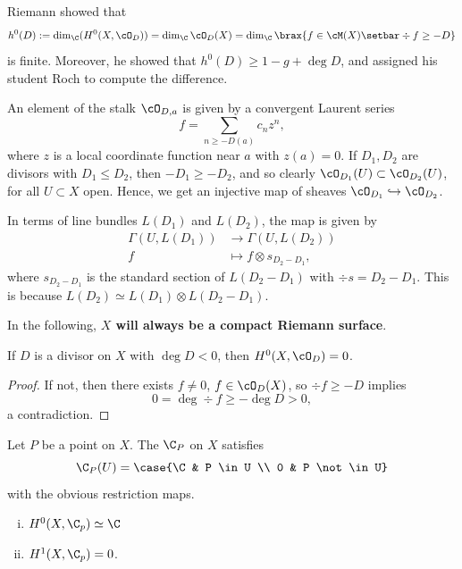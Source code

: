 \documentclass[11pt]{report}
\begin{document}
\begin{notebox}
    Riemann showed that
    \[
    h^0(D):= \dim_\C(H^0(X,\cO_D))=\dim_\C \cO_D(X)=\dim_\C \brax{f \in \cM(X) \setbar \div f \geq -D}
    \]
    is finite. Moreover, he showed that $h^0(D) \geq 1 -g + \deg D$, and assigned his student Roch to compute the difference.
\end{notebox}

An element of the stalk $\cO_{D,a}$ is given by a convergent Laurent series
\[
f = \sum_{n \geq -D(a)}c_nz^n,
\]
where $z$ is a local coordinate function near $a$ with $z(a)=0$. If $D_1,D_2$ are divisors with $D_1 \leq D_2$, then $-D_1 \geq -D_2$, and so clearly $\cO_{D_1}(U) \subset \cO_{D_2}(U)$, for all $U \subset X$ open. Hence, we get an injective map of sheaves $\cO_{D_1} \hookrightarrow \cO_{D_2}$. 

In terms of line bundles $L(D_1)$ and $L(D_2)$, the map is given by 
\begin{align*}
    \Gamma(U, L(D_1)) &\to \Gamma(U, L(D_2))
    \\ f & \mapsto f \otimes s_{D_2-D_1},
\end{align*}
where $s_{D_2-D_1}$ is the standard section of $L(D_2 - D_1)$ with $\div s = D_2-D_1$. This is because $L(D_2) \simeq L(D_1) \otimes L(D_2 - D_1)$.

In the following, \textbf{$X$ will always be a compact Riemann surface}.

\begin{prop}
If $D$ is a divisor on $X$ with $\deg D < 0$, then $H^0(X,\cO_D)=0$.
\end{prop}

\begin{proof}
If not, then there exists $f \neq 0$, $f \in \cO_D(X)$, so $\div f \geq -D$ implies $$0 = \deg \div f \geq -\deg D >0,$$ a contradiction.
\end{proof}

\begin{defn}[Recall]
Let $P$ be a point on $X$. The  $\C_P$ on $X$ satisfies
\[
\C_P(U)= \case{\C & P \in U \\ 0 & P \not \in U}
\]
with the obvious restriction maps. 
\end{defn}

\begin{prop}
\begin{enumerate}[(i)]
    \item $H^0(X,\C_p) \simeq \C$
    \item $H^1(X,\C_p)=0$.
\end{enumerate}
\end{prop}
\end{document}
